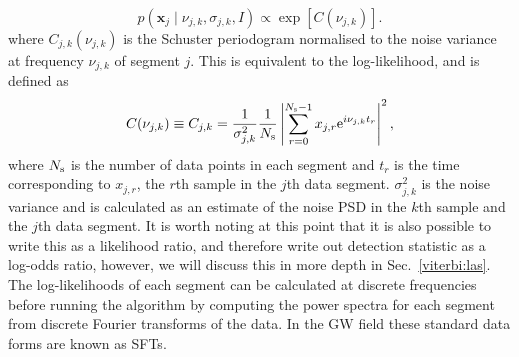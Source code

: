 %
\begin{equation}
\label{viterbi:single:likelihood}
p({\bm x_j} \mid \nu_{j,k}, \sigma_{j,k}, I) \propto
\exp\left[{C(\nu_{j,k})}\right].
\end{equation}
%
where
$C_{j,k}(\nu_{j,k})$ is the Schuster periodogram normalised to the noise variance at
frequency $\nu_{j,k}$ of segment $j$. This is equivalent to the log-likelihood, and is defined as
%
\begin{equation}
\label{viterbi:periodogram}
C(\nu_{j,k}) \equiv C_{j,k}=  \frac{1}{\sigma_{j,k}^2}\frac{1}{N_{\rm s}}\left|\sum_{r=0}^{N_{\rm
s}-1}x_{j,r} {\rm
e}^{i\nu_{j,k} t_r}\right|^2,
\end{equation}
%
where $N_{\rm s}$ is the number of data points in each segment and $t_{r}$ is the time corresponding to $x_{j,r}$, the $r$th sample in the $j$th data segment. $\sigma_{j,k}^2$ is the noise variance and is calculated as an estimate of the noise \ac{PSD} in the $k$th sample and the $j$th data segment. It is worth noting at this point that it is also possible to write this as a likelihood ratio, and therefore write out detection statistic as a log-odds ratio, however, we will discuss this in more depth in Sec.~\ref{viterbi:las}. The log-likelihoods of each segment can be calculated at discrete frequencies before running the algorithm by computing the power spectra for each segment from discrete Fourier transforms of the data. In the \ac{GW} field these standard data forms are known as \acp{SFT}.

